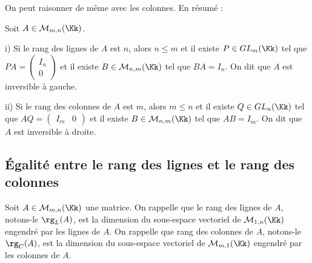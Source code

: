 \documentclass[class=report,crop=false]{standalone}
\newcommand{\GL}{GL}
\begin{document}
On peut raisonner de même avec les colonnes. En résumé :
\begin{theoreme}\label{thm:inv-gd}
Soit $A \in \mathcal{M}_{m,n}(\Kk)$. 

i) Si le rang des lignes de $A$ est $n$, alors $n \le m$ et il existe $P \in \GL_m(\Kk)$ tel que $PA = \left( \begin{array}{c}
I_n\\ \hline
0
\end{array}\right) $ et il existe $B\in \mathcal{M}_{n,m}(\Kk)$ tel que $BA=I_n$. On dit que $A$ est inversible à gauche.

ii) Si le rang des colonnes de $A$ est $m$, alors $m \le n$ et il existe $Q \in \GL_n(\Kk)$ tel que $AQ = \left( \begin{array}{c|c}
I_m & 0
\end{array}\right) $ et il existe $B\in \mathcal{M}_{n,m}(\Kk)$ tel que $AB=I_m$. On dit que $A$ est inversible à droite.

\end{theoreme}

\subsection{\'Egalité entre le rang des lignes et le rang des colonnes}


Soit $A \in \mathcal{M}_{m,n}(\Kk)$ une matrice. On rappelle que le rang des lignes de $A$, notons-le $\rg_L(A)$, est la dimension du sous-espace vectoriel de $\mathcal{M}_{1,n}(\Kk)$ engendré par les lignes de $A$. On rappelle que  rang des colonnes de $A$, notons-le $\rg_C(A)$, est la dimension du sous-espace vectoriel de $\mathcal{M}_{m,1}(\Kk)$ engendré par les colonnes de $A$.
\end{document}
